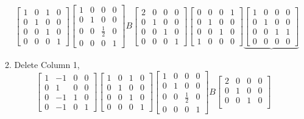 \documentclass[letterpaper,10pt]{article}
\begin{document}
\begin{enumerate}
\begin{enumerate}
\[\begin{bmatrix}
1 & 0 & 1 & 0\\
0 & 1 & 0 & 0\\
0 & 0 & 1 & 0\\
0 & 0 & 0 & 1
\end{bmatrix} \begin{bmatrix}
1 & 0 & 0 & 0\\
0 & 1 & 0 & 0\\
0 & 0 & \frac{1}{2} & 0\\
0 & 0 & 0 & 1
\end{bmatrix}B\begin{bmatrix}
2 & 0 & 0 & 0\\
0 & 1 & 0 & 0\\
0 & 0 & 1 & 0\\
0 & 0 & 0 & 1
\end{bmatrix} \begin{bmatrix}
0 & 0 & 0 & 1\\
0 & 1 & 0 & 0\\
0 & 0 & 1 & 0\\
1 & 0 & 0 & 0
\end{bmatrix} \underbrace{\begin{bmatrix}
1 & 0 & 0 & 0\\
0 & 1 & 0 & 0\\
0 & 0 & 1 & 1\\
0 & 0 & 0 & 0
\end{bmatrix}}\]
\item Delete Column 1,
\[\begin{bmatrix}
1 & -1 & 0 & 0\\
0 & 1 & 0 & 0\\
0 & -1 & 1 & 0\\
0 & -1 & 0 & 1
\end{bmatrix} \begin{bmatrix}
1 & 0 & 1 & 0\\
0 & 1 & 0 & 0\\
0 & 0 & 1 & 0\\
0 & 0 & 0 & 1
\end{bmatrix} \begin{bmatrix}
1 & 0 & 0 & 0\\
0 & 1 & 0 & 0\\
0 & 0 & \frac{1}{2} & 0\\
0 & 0 & 0 & 1
\end{bmatrix}B\begin{bmatrix}
2 & 0 & 0 & 0\\
0 & 1 & 0 & 0\\
0 & 0 & 1 & 0\\

\end{bmatrix}\]
\end{enumerate}
\end{enumerate}
\end{document}
